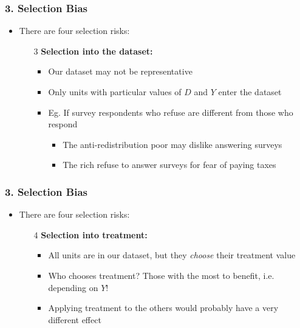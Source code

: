 \documentclass[xcolor=x11names,compress]{beamer}\usepackage[]{graphicx}\usepackage[]{color}
\renewcommand{\(}{\begin{columns}}
\renewcommand{\)}{\end{columns}}
\newcommand{\<}[1]{\begin{column}{#1}}
\renewcommand{\>}{\end{column}}
\begin{document}
\begin{frame}
\frametitle{3. Selection Bias}
\begin{itemize}
\item There are four selection risks:
\begin{enumerate}
\item[3] \textbf{Selection into the dataset:}
\pause
\begin{itemize}
\item Our dataset may not be representative
\pause
\item Only units with particular values of $D$ and $Y$ enter the dataset
\pause
\item Eg. If survey respondents who refuse are different from those who respond
\begin{itemize}
\item The anti-redistribution poor may dislike answering surveys 
\pause
\item The rich refuse to answer surveys for fear of paying taxes
\end{itemize}
\end{itemize}
\end{enumerate}
\end{itemize}
\end{frame}

\begin{frame}
\frametitle{3. Selection Bias}
\begin{itemize}
\item There are four selection risks:
\begin{enumerate}
\item[4] \textbf{Selection into treatment:}
\pause
\begin{itemize}
\item All units are in our dataset, but they \textit{choose} their treatment value
\pause
\item Who chooses treatment? Those with the most to benefit, i.e. depending on $Y$!
\pause
\item Applying treatment to the others would probably have a very different effect
\end{itemize}
\end{enumerate}
\end{itemize}
\end{frame}
\end{document}
